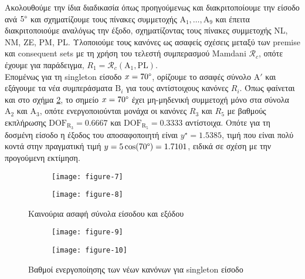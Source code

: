 \documentclass[11pt,a4paper,titlepage, oneside]{article}
\begin{document}
	Ακολουθούμε την ίδια διαδικασία όπως προηγούμενως και διακριτοποίουμε την είσοδο ανά $5\degree$ και σχηματίζουμε τους πίνακες συμμετοχής $\text{A}_1, \dotsc, \text{A}_9$ και έπειτα διακριτοποιούμε αναλόγως την έξοδο, σχηματίζοντας τους πίνακες συμμετοχής NL, NM, ZE, PM, PL. Υλοποιούμε τους κανόνες ως ασαφείς σχέσεις μεταξύ των premise και consequent sets με τη χρήση του τελεστή συμπερασμού Mamdani $\mathcal{R}_c$, οπότε έχουμε για παράδειγμα, $R_1 = \mathcal{R}_c \left(\text{A}_1, \text{PL}\right)$.\\
	
	Επομένως για τη singleton είσοδο $x = 70\degree$, ορίζουμε το ασαφές σύνολο $\text{A}'$ και εξάγουμε τα νέα συμπεράσματα $\text{B}_i$ για τους αντίστοιχους κανόνες $R_i$. Όπως φαίνεται και στο σχήμα \ref{fig:fuzzy_set_firings_2}, το σημείο $x = 70\degree$ έχει μη-μηδενική συμμετοχή μόνο στα σύνολα $\text{A}_2$  και $\text{A}_3$, οπότε ενεργοποιούνται μονάχα οι κανόνες $R_3$ και $R_5$ με βαθμούς εκπλήρωσης $\text{DOF}_{\text{R}_3} = 0.6667$ και $\text{DOF}_{\text{R}_5} = 0.3333$ αντίστοιχα. Οπότε για τη δοσμένη είσοδο η έξοδος του αποσαφοποιητή είναι $y^\star = 1.5385$, τιμή που είναι πολύ κοντά στην πραγματική τιμή $y = 5 \cos(70\degree) = 1.7101$, ειδικά σε σχέση με την προγούμενη εκτίμηση.\\
	
	\begin{figure}
		\centering
		\begin{subfigure}[c]{0.495\textwidth}
			\texttt{[image: figure-7]}
		\end{subfigure}
		\begin{subfigure}[c]{0.495\textwidth}
			\texttt{[image: figure-8]}
		\end{subfigure}
		\caption{Καινούρια ασαφή σύνολα είσοδου και εξόδου}
		\label{fig:xy_set_plots_2}
	\end{figure}
	
	\begin{figure}[h]
		\centering
		\begin{subfigure}[c]{0.495\textwidth}
			\texttt{[image: figure-9]}
		\end{subfigure}
		\begin{subfigure}[c]{0.495\textwidth}
			\texttt{[image: figure-10]}
		\end{subfigure}
		\caption{Βαθμοί ενεργοποίησης των νέων κανόνων για singleton είσοδο}
		\label{fig:fuzzy_set_firings_2}
	\end{figure}
	
\end{document}
